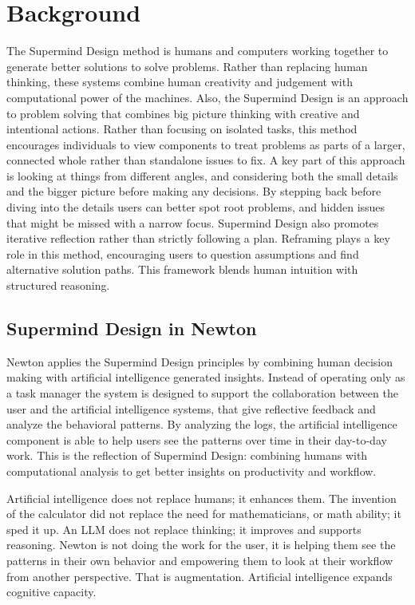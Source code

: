 \documentclass[12pt]{article}
\begin{document}
\section{Background}
The Supermind Design method is humans and computers working together to generate better solutions to solve problems. Rather than 
replacing human thinking, these systems combine human creativity and judgement with computational power of the machines. Also, the
 Supermind Design is an approach to problem solving that combines big picture thinking with creative and intentional actions. Rather 
 than focusing on isolated tasks, this method encourages individuals to view components to treat problems as parts of a larger, 
 connected whole rather than standalone issues to fix.  A key part of this approach is looking at things from different angles, and 
 considering both the small details and the bigger picture before making any decisions. By stepping back before diving into the 
 details users can better spot root problems, and hidden issues that might be missed with a narrow focus. Supermind Design also
  promotes iterative reflection rather than strictly following a plan. Reframing plays a key role in this method, encouraging users 
  to question assumptions and find alternative solution paths. This framework blends human intuition with structured reasoning.

\subsection{Supermind Design in Newton}
Newton applies the Supermind Design principles by combining human decision making with artificial intelligence generated insights. 
Instead of operating only as a task manager the system is designed to support the collaboration between the user and the artificial
 intelligence systems, that give reflective feedback and analyze the behavioral patterns.
By analyzing the logs, the artificial intelligence component is able to help users see the patterns over time in their day-to-day 
work. This is the reflection of Supermind Design: combining humans with computational analysis to get better insights on productivity
 and workflow.

Artificial intelligence does not replace humans; it enhances them. The invention of the calculator did not replace the need for
 mathematicians, or math ability; it sped it up. An LLM does not replace thinking; it improves and supports reasoning. Newton is
  not doing the work for the user, it is helping them see the patterns in their own behavior and empowering them to look at their
   workflow from another perspective. That is augmentation. Artificial intelligence expands cognitive capacity. 
\end{document}
